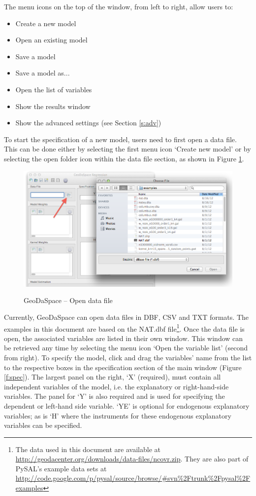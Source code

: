 \documentclass{article}
\begin{document}
\clearpage

The menu icons on the top of the window, from left to right, allow users to:
\begin{itemize}
\item Create a new model
\item Open an existing model
\item Save a model
\item Save a model as...
\item Open the list of variables
\item Show the results window
\item Show the advanced settings (see Section \ref{s:adv})
\end{itemize}

To start the specification of a new model, users need to first open a data file. This can be done either by selecting the first menu icon `Create new model' or by selecting the open folder icon within the data file section, as shown in Figure \ref{f:opendb}.

\begin{figure}[htb]
\begin{center}
\includegraphics[width=0.9\linewidth]{opendb.png}\\
\caption{GeoDaSpace -- Open data file}
\label{f:opendb}
\end{center}
\end{figure}

Currently, GeoDaSpace can open data files in DBF, CSV and TXT formats. The examples in this document are based on the NAT.dbf file\footnote{The data used in this document are available at \url{http://geodacenter.org/downloads/data-files/ncovr.zip}. They are also part of PySAL's example data sets at \url{http://code.google.com/p/pysal/source/browse/\#svn\%2Ftrunk\%2Fpysal\%2Fexamples}}. Once the data file is open, the associated variables are listed in their own window. This window can be retrieved any time by selecting the menu icon `Open the variable list' (second from right). To specify the model, click and drag the variables' name from the list to the respective boxes in the specification section of the main window (Figure \ref{f:spec}). The largest panel on the right, `X' (required), must contain all independent variables of the model, i.e. the explanatory or right-hand-side variables. The panel for `Y' is also required and is used for specifying the dependent or left-hand side variable. `YE'  is optional for endogenous explanatory variables; as is `H'  where the instruments for these endogenous explanatory variables can be specified.
\end{document}
